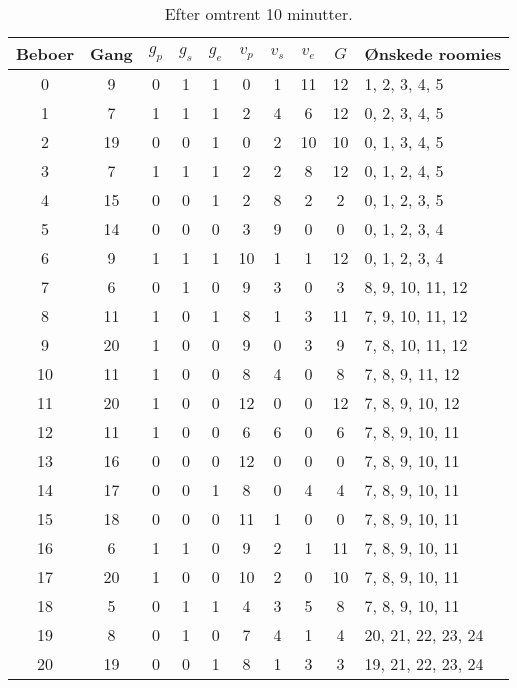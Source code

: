 \documentclass[article,oneside,11pt,a4paper]{memoir}
\newenvironment{assignment}[1]{
\begin{table}[h]
\caption{#1}
\footnotesize
\begin{center}
\begin{tabular}{cccccccccl}
\toprule
Beboer & Gang & $g_p$ & $g_s$ & $g_e$ & $v_p$ & $v_s$ & $v_e$ & $G$ & Ønskede roomies \\ \midrule
}{
\bottomrule
\end{tabular}
\end{center}
\end{table}

}
\begin{document}
\begin{assignment}{Efter omtrent 10 minutter.}
     0 &    9 &   0 &   1 &   1 &   0 &   1 &  11 & 12 &  1,  2,  3,  4,  5 \\
     1 &    7 &   1 &   1 &   1 &   2 &   4 &   6 & 12 &  0,  2,  3,  4,  5 \\
     2 &   19 &   0 &   0 &   1 &   0 &   2 &  10 & 10 &  0,  1,  3,  4,  5 \\
     3 &    7 &   1 &   1 &   1 &   2 &   2 &   8 & 12 &  0,  1,  2,  4,  5 \\
     4 &   15 &   0 &   0 &   1 &   2 &   8 &   2 &  2 &  0,  1,  2,  3,  5 \\
     5 &   14 &   0 &   0 &   0 &   3 &   9 &   0 &  0 &  0,  1,  2,  3,  4 \\
     6 &    9 &   1 &   1 &   1 &  10 &   1 &   1 & 12 &  0,  1,  2,  3,  4 \\ \midrule
     7 &    6 &   0 &   1 &   0 &   9 &   3 &   0 &  3 &  8,  9, 10, 11, 12 \\
     8 &   11 &   1 &   0 &   1 &   8 &   1 &   3 & 11 &  7,  9, 10, 11, 12 \\
     9 &   20 &   1 &   0 &   0 &   9 &   0 &   3 &  9 &  7,  8, 10, 11, 12 \\
    10 &   11 &   1 &   0 &   0 &   8 &   4 &   0 &  8 &  7,  8,  9, 11, 12 \\
    11 &   20 &   1 &   0 &   0 &  12 &   0 &   0 & 12 &  7,  8,  9, 10, 12 \\
    12 &   11 &   1 &   0 &   0 &   6 &   6 &   0 &  6 &  7,  8,  9, 10, 11 \\
    13 &   16 &   0 &   0 &   0 &  12 &   0 &   0 &  0 &  7,  8,  9, 10, 11 \\
    14 &   17 &   0 &   0 &   1 &   8 &   0 &   4 &  4 &  7,  8,  9, 10, 11 \\
    15 &   18 &   0 &   0 &   0 &  11 &   1 &   0 &  0 &  7,  8,  9, 10, 11 \\
    16 &    6 &   1 &   1 &   0 &   9 &   2 &   1 & 11 &  7,  8,  9, 10, 11 \\
    17 &   20 &   1 &   0 &   0 &  10 &   2 &   0 & 10 &  7,  8,  9, 10, 11 \\
    18 &    5 &   0 &   1 &   1 &   4 &   3 &   5 &  8 &  7,  8,  9, 10, 11 \\ \midrule
    19 &    8 &   0 &   1 &   0 &   7 &   4 &   1 &  4 & 20, 21, 22, 23, 24 \\
    20 &   19 &   0 &   0 &   1 &   8 &   1 &   3 &  3 & 19, 21, 22, 23, 24 \\

\end{assignment}
\end{document}
